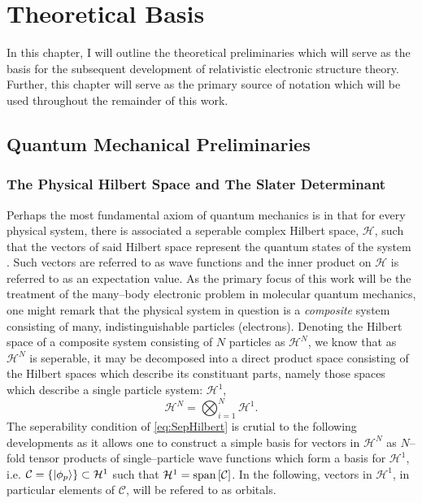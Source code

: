 \chapter{Theoretical Basis}
\label{ch:Theory}

In this chapter, I will outline the theoretical preliminaries which will serve as the basis
for the subsequent development of relativistic electronic structure theory. Further, this
chapter will serve as the primary source of notation which will be used throughout the
remainder of this work. 

\section{Quantum Mechanical Preliminaries}
\label{sec:QM}

\subsection{The Physical Hilbert Space and The Slater Determinant}
\label{sec:SD}

Perhaps the most fundamental axiom of quantum mechanics is in that for every physical
system, there is associated a seperable complex Hilbert space, $\mathcal{H}$, such that
the vectors of said Hilbert space represent the quantum states 
of the system \cite{VonNeumann55_book}. Such vectors are referred to as wave functions
and the inner product on $\mathcal{H}$ is referred to as an expectation value.
As the primary focus of this work will be the treatment of the many--body electronic
problem in molecular quantum mechanics, one might remark that the physical system
in question is a \emph{composite} system consisting of many, indistinguishable 
particles (electrons). Denoting the Hilbert space of a composite system consisting
of $N$ particles as $\mathcal{H}^N$, we know that as $\mathcal{H}^N$ is seperable,
it may be decomposed into a direct product space consisting of the Hilbert spaces
which describe its constituant parts, namely those spaces which describe a
single particle system: $\mathcal{H}^1$,
\begin{equation}
  \label{eq:SepHilbert}
  \mathcal{H}^N = \bigotimes_{i = 1}^N \mathcal{H}^1.
\end{equation}
The seperability condition of \cref{eq:SepHilbert} is crutial to the following developments
as it allows one to construct a simple basis for vectors in $\mathcal{H}^N$
as $N$--fold tensor products of single--particle wave functions which form a basis for $\mathcal{H}^1$, 
i.e. $\mathcal{C} = \left \lbrace \left\vert \phi_p \right\rangle \right\rbrace  \subset \mathcal{H}^1$ such that 
$\mathcal{H}^1 = \mathrm{span}\left[ \mathcal{C} \right]$. In the following, vectors in $\mathcal{H}^1$, in particular elements of $\mathcal{C}$,
will be refered to as orbitals.

